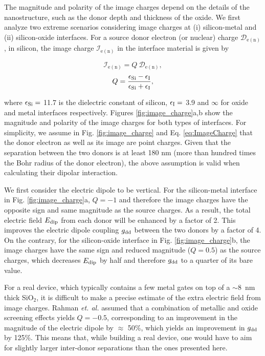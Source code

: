 The magnitude and polarity of the image charges depend on the details of the nanostructure, such as the donor depth and thickness of the oxide. We first analyze two extreme scenarios considering image charges at (i) silicon-metal and (ii) silicon-oxide interfaces. For a source donor electron (or nuclear) charge $\mathcal{D}_\mathrm{e(n)}$, in silicon, the image charge $\mathcal{I}_\mathrm{e(n)}$ in the interface material is given by\cite{Rahman2009S}

\begin{equation} \label{eq:ImageCharge}
\mathcal{I}_\mathrm{e(n)}=Q~\mathcal{D}_\mathrm{e(n)},
\end{equation}
\begin{equation} \label{eq:Q}
Q=\frac{\epsilon_{\rm Si} - \epsilon_{\rm I}}{\epsilon_{\rm Si} + \epsilon_{\rm I}},
\end{equation}

where $\epsilon_{\rm Si} =$ 11.7 is the dielectric constant of silicon,  $\epsilon_{\rm I} =$ 3.9 and  $\infty$  for oxide and metal interfaces respectively. Figures \ref{fig:image_charge}a,b show the magnitude and polarity of the image charges for both types of interfaces. For simplicity, we assume in Fig. \ref{fig:image_charge} and Eq. \ref{eq:ImageCharge} that the donor electron as well as its image are point charges. Given that the separation between the two donors is at least 180 nm (more than hundred times the Bohr radius of the donor electron), the above assumption is valid when calculating their dipolar interaction. 

We first consider the electric dipole to be vertical. For the silicon-metal interface in Fig. \ref{fig:image_charge}a, $Q=-1$ and therefore the image charges have the opposite sign and same magnitude as the source charges. As a result, the total electric field  $E_{\rm dip}$ from each donor will be enhanced by a factor of 2. This improves the electric dipole coupling $g_{\rm dd}$ between the two donors by a factor of 4. On the contrary, for the silicon-oxide interface in Fig. \ref{fig:image_charge}b, the image charges have the same sign and reduced magnitude ($Q=0.5$) as the source charges, which decreases $E_{\rm dip}$ by half and therefore $g_{\rm dd}$ to a quarter of its bare value.

For a real device, which typically contains a few metal gates on top of a $\sim8$~nm thick SiO$_2$, it is difficult to make a precise estimate of the extra electric field from image charges. Rahman \textit{et. al.} \cite{Rahman2009S} assumed that a combination of metallic and oxide screening effects yields $Q=-0.5$, corresponding to an improvement in the magnitude of the electric dipole by $\approx$ 50\%, which yields an improvement in $g_{\rm dd}$ by 125\%. 
This means that, while building a real device, one would have to aim for slightly larger inter-donor separations than the ones presented here.

